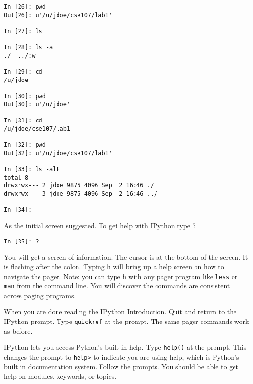 \documentclass[12pt]{article}
\begin{document}
\begin{lstlisting}[style=bash]
In [26]: pwd
Out[26]: u'/u/jdoe/cse107/lab1'

In [27]: ls

In [28]: ls -a
./  ../:w

In [29]: cd
/u/jdoe

In [30]: pwd
Out[30]: u'/u/jdoe'

In [31]: cd -
/u/jdoe/cse107/lab1

In [32]: pwd
Out[32]: u'/u/jdoe/cse107/lab1'

In [33]: ls -alF
total 8
drwxrwx--- 2 jdoe 9876 4096 Sep  2 16:46 ./
drwxrwx--- 3 jdoe 9876 4096 Sep  2 16:46 ../

In [34]:
\end{lstlisting}

As the initial screen suggested. To get help with IPython type ?

\begin{lstlisting}[style=bash]
In [35]: ?
\end{lstlisting}

You will get a screen of information. The cursor is at the bottom of the screen. It is flashing after the colon. Typing \texttt{h} will bring up a help screen on how to navigate the pager. Note: you can type \texttt{h} with any pager program like \texttt{less} or \texttt{man} from the command line. You will discover the commands are consistent across paging programs.

When you are done reading the IPython Introduction. Quit and return to the IPython prompt. Type \texttt{quickref} at the prompt. The same pager commands work as before. 

IPython lets you access Python's built in help. Type \texttt{help()} at the prompt. This changes the prompt to \texttt{help>} to indicate you are using help, which is Python's built in documentation system. Follow the prompts. You should be able to get help on \textquotesingle modules\textquotesingle, \textquotesingle keywords\textquotesingle, or \textquotesingle topics\textquotesingle .
\end{document}
